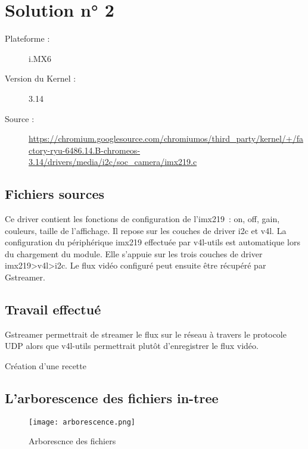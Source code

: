 
\chapter{Solution n° 2} %

\label{Chapter3} %

\begin{description}
  \item[Plateforme :] i.MX6
  \item[Version du Kernel :] 3.14
  \item[Source :] \href{https://chromium.googlesource.com/chromiumos/third_party/kernel/+/factory-ryu-6486.14.B-chromeos-3.14/drivers/media/i2c/soc_camera/imx219.c}
  {https://chromium.googlesource.com/chromiumos/third\_party/kernel/+/factory-ryu-6486.14.B-chromeos-3.14/drivers/media/i2c/soc\_camera/imx219.c} \\
\end{description}


\section{Fichiers sources}
Ce driver contient les fonctions de configuration de l’imx219 : on, off, gain,
couleurs, taille de l’affichage. Il repose sur les couches de driver i2c et v4l.
La configuration du périphérique imx219 effectuée par v4l-utils est automatique
lors du chargement du module. Elle s’appuie sur les trois couches de driver
imx219>v4l>i2c. Le flux vidéo configuré peut ensuite être récupéré par Gstreamer.

\section{Travail effectué}
\begin{description}
\item Gstreamer permettrait de streamer le flux sur le réseau à travers le protocole
UDP alors que v4l-utils permettrait plutôt d’enregistrer le flux vidéo.
\item Création d’une recette
\end{description}

\section{L’arborescence des fichiers in-tree}
\begin{figure}[th]
    \centering
    \texttt{[image: arborescence.png]}
    \decoRule
    \caption{Arborescnce des fichiers}  \label{fig:arbor}
\end{figure}

